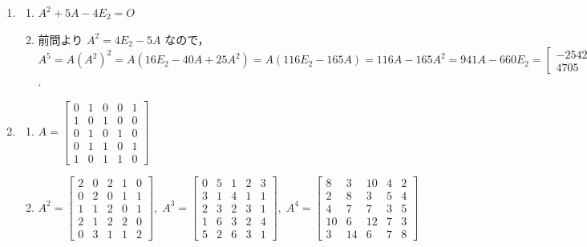 \documentclass[11pt, uplatex, dvipdfmx]{jsarticle}
\begin{document}
\begin{enumerate}
\item
  \begin{enumerate}[(1)]
    \setlength{\itemsep}{1ex}
    
  \item $A^2+5A-4E_2=O$

  \item 前問より $A^2=4E_2-5A$
    なので，$A^5 =
    A(A^2)^2=A(16E_2-40A+25A^2)=A(116E_2-165A)=116A-165A^2=941A-660E_2 = \left[
      \begin{array}{rr}
        -2542 & 1882\\
        4705 & -3483
      \end{array}
    \right]$.
  \end{enumerate}

\item
  \begin{enumerate}[(1)]
    \setlength{\itemsep}{1ex}
    
  \item $A=\left[
      \begin{array}{rrrrr}
        0 & 1 & 0 & 0 & 1\\
        1 & 0 & 1 & 0 & 0\\
        0 & 1 & 0 & 1 & 0\\
        0 & 1 & 1 & 0 & 1\\
        1 & 0 & 1 & 1 & 0
      \end{array}
    \right]$

  \item $A^2=\left[
      \begin{array}{rrrrr}
        2 & 0 & 2 & 1 & 0\\
        0 & 2 & 0 & 1 & 1\\
        1 & 1 & 2 & 0 & 1\\
        2 & 1 & 2 & 2 & 0\\
        0 & 3 & 1 & 1 & 2
      \end{array}
    \right], \; A^3=\left[
      \begin{array}{rrrrr}
        0 & 5 & 1 & 2 & 3\\
        3 & 1 & 4 & 1 & 1\\
        2 & 3 & 2 & 3 & 1\\
        1 & 6 & 3 & 2 & 4\\
        5 & 2 & 6 & 3 & 1
      \end{array}
    \right], \; A^4=\left[
      \begin{array}{rrrrr}
        8 & 3 & 10 & 4 & 2 \\
        2 & 8 & 3 & 5 & 4 \\
        4 & 7 & 7 & 3 & 5 \\
        10 & 6 & 12 & 7 & 3 \\
        3 & 14 & 6 & 7 & 8 
      \end{array}
    \right]$


\end{enumerate}
\end{enumerate}
\end{document}
